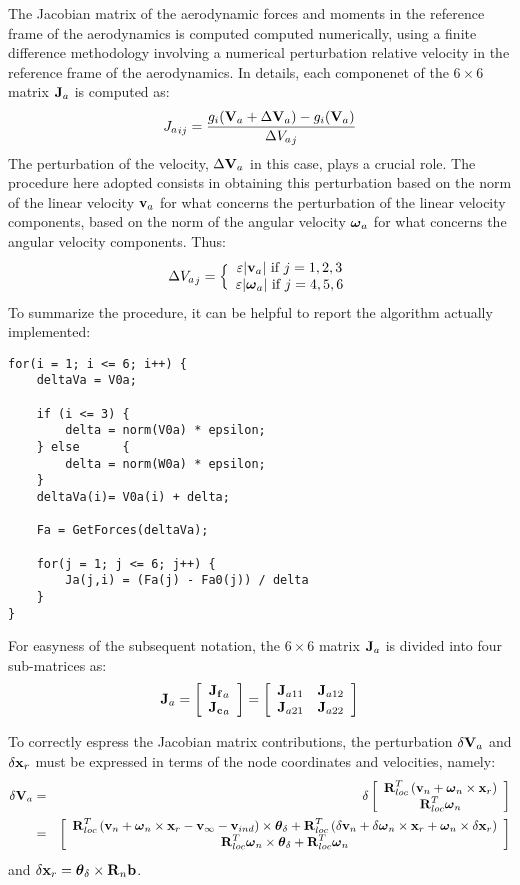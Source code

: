 The Jacobian matrix of the aerodynamic forces and moments in the reference 
frame of the aerodynamics is computed computed numerically, using a finite 
difference methodology involving a numerical perturbation relative velocity
in the reference frame of the aerodynamics. In details, each componenet
of the $6\times6$ matrix $\T{J}_a$ is computed as:
\begin{equation}
	{J_a}_{ij} = \frac{g_i(\T{V}_a + \Delta\T{V}_a) 
		- g_i(\T{V}_a)}{\Delta {V_a}_j}
\end{equation}
The perturbation of the velocity, $\Delta\T{V}_a$ in this case, plays
a crucial role. The procedure here adopted consists in obtaining this
perturbation based on the norm of the linear velocity $\T{v}_a$ for what 
concerns the perturbation of the linear velocity components, based on
the norm of the angular velocity $\T{\omega}_a$ for what concerns 
the angular velocity components. Thus:
\begin{equation}
	\Delta {V_a}_j = \Bigl\{\matr{c}{
		\varepsilon\lvert\T{v}_a\lvert\text{ if $j = 1,2,3$}\\
		\varepsilon\lvert\T{\omega}_a\lvert\text{ if $j = 4,5,6$}
		}
\end{equation}
To summarize the procedure, it can be helpful to report the algorithm
actually implemented:
\begin{verbatim}
for(i = 1; i <= 6; i++)	{
    deltaVa = V0a; 
				
    if (i <= 3)	{
        delta = norm(V0a) * epsilon;
    } else		{
        delta = norm(W0a) * epsilon;
    }
    deltaVa(i)= V0a(i) + delta;
					
    Fa = GetForces(deltaVa);
	
    for(j = 1; j <= 6; j++)	{
        Ja(j,i) = (Fa(j) - Fa0(j)) / delta 
    }
}
\end{verbatim}

For easyness of the subsequent notation, the $6\times6$ matrix $\T{J}_a$ is 
divided into four sub-matrices as:
\begin{equation}
	\T{J}_a = \sqbr{\matr{c}{\T{J_f}_a\\\T{J_c}_a}}
	=\sqbr{\matr{cc}{\T{J}_{a11} & \T{J}_{a12}\\ \T{J}_{a21} & \T{J}_{a22}}}
\end{equation}

To correctly espress the Jacobian matrix contributions, the perturbation 
$\delta\T{V}_a$ and $\delta \T{x}_r$ must be expressed in terms of 
the node coordinates and velocities, namely:
\begin{eqnarray}
	\delta\T{V}_a &=& \delta\sqbr{\matr{c}{
		\T{R}^T_{loc} \plbr{\T{v}_n + \T{\omega}_n\times\T{x}_r}\\
		\T{R}^T_{loc} \T{\omega}_n
		}} \\
\nonumber&=&\sqbr{\matr{c}{
	\T{R}^T_{loc}\plbr{
			\T{v}_n + \T{\omega}_n\times\T{x}_r 
			- \T{v}_{\infty} - \T{v}_{ind}} \times \T{\theta}_\delta+ 
			\T{R}^T_{loc}\plbr{
				\delta\T{v}_n + \delta\T{\omega}_n\times\T{x}_r +
				\T{\omega}_n\times\delta\T{x}_r}\\
	\T{R}^T_{loc}\T{\omega}_n \times\T{\theta}_\delta+ \T{R}^T_{loc}\T{\omega}_n
	}}
\end{eqnarray}
and $\delta\T{x}_r = \T{\theta}_\delta\times\T{R}_n\T{b}$.

